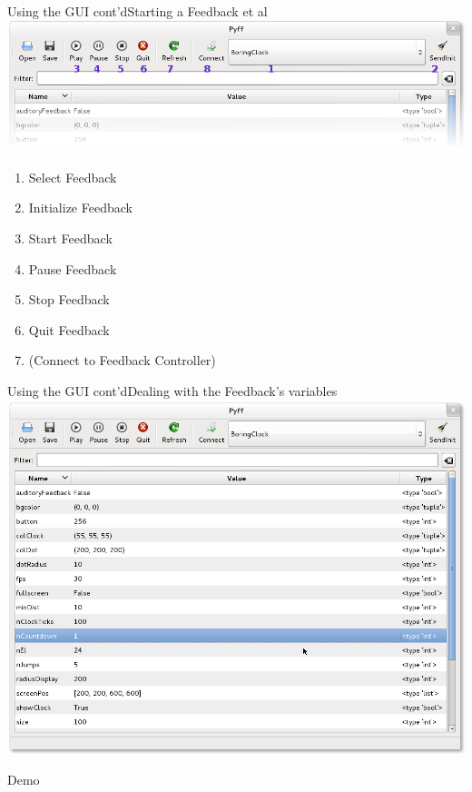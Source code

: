 \documentclass{beamer}
\begin{document}
\begin{frame}{Using the GUI cont'd}{Starting a Feedback et al}
    \includegraphics[width=\linewidth]{gui_walkthrough}
    \begin{enumerate}
        \item Select Feedback
        \item Initialize Feedback
        \item Start Feedback
        \item Pause Feedback
        \item Stop Feedback
        \item Quit Feedback
        \item (Connect to Feedback Controller)
    \end{enumerate}
\end{frame}

\begin{frame}{Using the GUI cont'd}{Dealing with the Feedback's variables}
    \includegraphics[width=.9\linewidth]{gui}
\end{frame}

\begin{frame}[plain]
    \begin{center}
        \huge{Demo}
    \end{center}
\end{frame}
\end{document}
